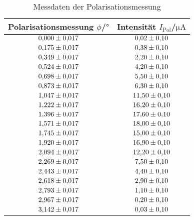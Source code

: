 \begin{table}
 \caption{Messdaten der Polarisationsmessung}
 \label{tab:polarisation}
 \centering
{} \begin{tabular}{SS}
 \toprule 
    {Polarisationsmessung $\phi$/$\si{\degree}$}& {Intensität $I_{\mathrm{Pol}}$/$\si{\micro\ampere}$} \\
     \midrule
     $\num{0.000 \pm 0.017}$ & $\num{0.02\pm0.10}$ \\
     $\num{0.175 \pm 0.017}$ & $\num{0.38\pm0.10}$ \\
     $\num{0.349 \pm 0.017}$ & $\num{2.20\pm0.10}$ \\
     $\num{0.524 \pm 0.017}$ & $\num{4.20\pm0.10}$ \\
     $\num{0.698 \pm 0.017}$ & $\num{5.50\pm0.10}$ \\
     $\num{0.873 \pm 0.017}$ & $\num{6.30\pm0.10}$ \\
     $\num{1.047 \pm 0.017}$ & $\num{11.50\pm0.10}$ \\
     $\num{1.222 \pm 0.017}$ & $\num{16.20\pm0.10}$ \\
     $\num{1.396 \pm 0.017}$ & $\num{17.60\pm0.10}$ \\
     $\num{1.571 \pm 0.017}$ & $\num{18.00\pm0.10}$ \\
     $\num{1.745 \pm 0.017}$ & $\num{15.00\pm0.10}$ \\
     $\num{1.920 \pm 0.017}$ & $\num{16.90\pm0.10}$ \\
     $\num{2.094 \pm 0.017}$ & $\num{12.20\pm0.10}$ \\
     $\num{2.269 \pm 0.017}$ & $\num{7.50\pm0.10}$ \\
     $\num{2.443 \pm 0.017}$ & $\num{4.40\pm0.10}$ \\
     $\num{2.618 \pm 0.017}$ & $\num{2.90\pm0.10}$ \\
     $\num{2.793 \pm 0.017}$ & $\num{1.10\pm0.10}$ \\
     $\num{2.967 \pm 0.017}$ & $\num{0.20\pm0.10}$ \\
     $\num{3.142 \pm 0.017}$ & $\num{0.03\pm0.10}$ \\
 \bottomrule
 \end{tabular}
\end{table}